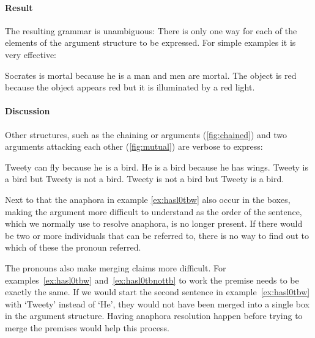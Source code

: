 
\paragraph{Result} The resulting grammar is unambiguous: There is only one way for each of the elements of the argument structure to be expressed. For simple examples it is very effective:

\begin{exe}
    \ex Socrates is mortal because he is a man and men are mortal.
    \ex The object is red because the object appears red but it is illuminated by a red light.
\end{exe}

\paragraph{Discussion}
Other structures, such as the chaining or arguments (\autoref{fig:chained}) and two arguments attacking each other (\autoref{fig:mutual}) are verbose to express:

\begin{exe}
    \ex\label{ex:hasl0tbw} Tweety can fly because he is a bird. He is a bird because he has wings.
    \ex\label{ex:hasl0tbnottb} Tweety is a bird but Tweety is not a bird. Tweety is not a bird but Tweety is a bird.
\end{exe}

\noindent Next to that the anaphora in example \ref{ex:hasl0tbw} also occur in the boxes, making the argument more difficult to understand as the order of the sentence, which we normally use to resolve anaphora, is no longer present. If there would be two or more individuals that can be referred to, there is no way to find out to which of these the pronoun referred.

The pronouns also make merging claims more difficult. For examples~\ref{ex:hasl0tbw} and~\ref{ex:hasl0tbnottb} to work the premise needs to be exactly the same. If we would start the second sentence in example~\ref{ex:hasl0tbw} with `Tweety' instead of `He', they would not have been merged into a single box in the argument structure. Having anaphora resolution happen before trying to merge the premises would help this process.
